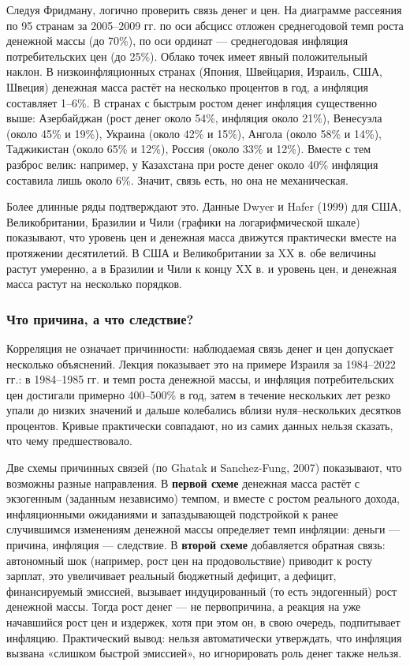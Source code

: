 \documentclass[11pt,a4paper]{article}
\begin{document}
Следуя Фридману, логично проверить связь денег и цен. На диаграмме рассеяния по 95 странам за 2005--2009 гг. по оси абсцисс отложен среднегодовой темп роста денежной массы (до 70\%), по оси ординат --- среднегодовая инфляция потребительских цен (до 25\%). Облако точек имеет явный положительный наклон. В низкоинфляционных странах (Япония, Швейцария, Израиль, США, Швеция) денежная масса растёт на несколько процентов в год, а инфляция составляет 1--6\%. В странах с быстрым ростом денег инфляция существенно выше: Азербайджан (рост денег около 54\%, инфляция около 21\%), Венесуэла (около 45\% и 19\%), Украина (около 42\% и 15\%), Ангола (около 58\% и 14\%), Таджикистан (около 65\% и 12\%), Россия (около 33\% и 12\%). Вместе с тем разброс велик: например, у Казахстана при росте денег около 40\% инфляция составила лишь около 6\%. Значит, связь есть, но она не механическая.

Более длинные ряды подтверждают это. Данные Dwyer и Hafer (1999) для США, Великобритании, Бразилии и Чили (графики на логарифмической шкале) показывают, что уровень цен и денежная масса движутся практически вместе на протяжении десятилетий. В США и Великобритании за XX в. обе величины растут умеренно, а в Бразилии и Чили к концу XX в. и уровень цен, и денежная масса растут на несколько порядков.

\subsubsection{Что причина, а что следствие?}

Корреляция не означает причинности: наблюдаемая связь денег и цен допускает несколько объяснений. Лекция показывает это на примере Израиля за 1984--2022 гг.: в 1984--1985 гг. и темп роста денежной массы, и инфляция потребительских цен достигали примерно 400--500\% в год, затем в течение нескольких лет резко упали до низких значений и дальше колебались вблизи нуля--нескольких десятков процентов. Кривые практически совпадают, но из самих данных нельзя сказать, что чему предшествовало.

Две схемы причинных связей (по Ghatak и Sanchez-Fung, 2007) показывают, что возможны разные направления. В \textbf{первой схеме} денежная масса растёт с экзогенным (заданным независимо) темпом, и вместе с ростом реального дохода, инфляционными ожиданиями и запаздывающей подстройкой к ранее случившимся изменениям денежной массы определяет темп инфляции: деньги --- причина, инфляция --- следствие. В \textbf{второй схеме} добавляется обратная связь: автономный шок (например, рост цен на продовольствие) приводит к росту зарплат, это увеличивает реальный бюджетный дефицит, а дефицит, финансируемый эмиссией, вызывает индуцированный (то есть эндогенный) рост денежной массы. Тогда рост денег --- не первопричина, а реакция на уже начавшийся рост цен и издержек, хотя при этом он, в свою очередь, подпитывает инфляцию. Практический вывод: нельзя автоматически утверждать, что инфляция вызвана «слишком быстрой эмиссией», но игнорировать роль денег также нельзя.
\end{document}
